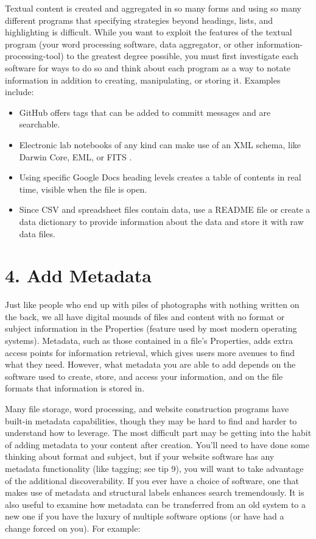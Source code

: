 \documentclass[10pt,letterpaper]{article}
\newcommand{\rulemajor}[1]{\section*{#1}}
\begin{document}
Textual content is created and aggregated in so many forms and using so many
different programs that specifying strategies beyond headings, lists, and
highlighting is difficult. While you want to exploit the features of the textual
program (your word processing software, data aggregator, or other
information-processing-tool) to the greatest degree possible, you must first
investigate each software for ways to do so and think about each program as a
way to notate information in addition to creating, manipulating, or storing
it. Examples include:

\begin{itemize}

\item
  GitHub offers tags that can be added to committ messages and are searchable.

\item
  Electronic lab notebooks of any kind can make use of an XML schema, like
  Darwin Core, EML, or FITS \cite{Briney2015}.

\item
  Using specific Google Docs heading levels creates a table of contents in real
  time, visible when the file is open.

\item
  Since CSV and spreadsheet files contain data, use a README file or create a
  data dictionary to provide information about the data and store it with raw
  data files.

\end{itemize}

\rulemajor{4. Add Metadata}

Just like people who end up with piles of photographs with nothing written on
the back, we all have digital mounds of files and content with no format or
subject information in the Properties (feature used by most modern operating
systems). Metadata, such as those contained in a file's Properties, adds extra
access points for information retrieval, which gives users more avenues to find
what they need. However, what metadata you are able to add depends on the
software used to create, store, and access your information, and on the file
formats that information is stored in.

Many file storage, word processing, and website construction programs have
built-in metadata capabilities, though they may be hard to find and harder to
understand how to leverage. The most difficult part may be getting into the
habit of adding metadata to your content after creation. You'll need to have
done some thinking about format and subject, but if your website software has
any metadata functionality (like tagging; see tip 9), you will want to take
advantage of the additional discoverability. If you ever have a choice of
software, one that makes use of metadata and structural labels enhances search
tremendously. It is also useful to examine how metadata can be transferred from
an old system to a new one if you have the luxury of multiple software options
(or have had a change forced on you).  For example:
\end{document}
